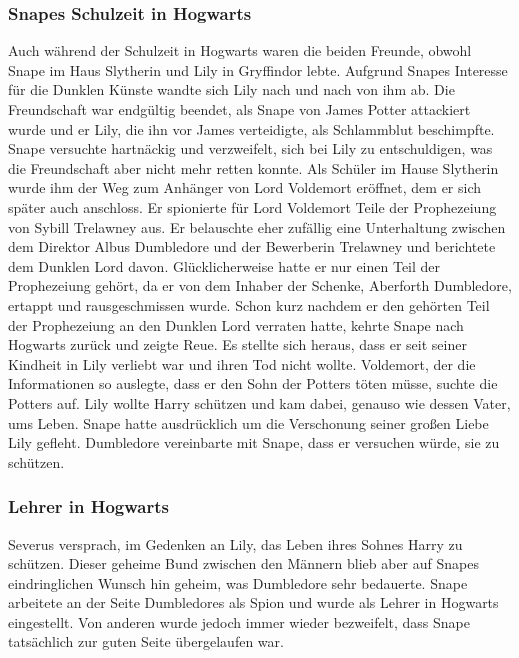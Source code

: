 \documentclass[a4paper, 10pt]{article}
\begin{document}
\subsubsection*{\large Snapes Schulzeit in Hogwarts}
Auch während der Schulzeit in Hogwarts waren die beiden Freunde, obwohl Snape im Haus Slytherin und Lily in Gryffindor lebte. Aufgrund Snapes Interesse für die Dunklen Künste wandte sich Lily nach und nach von ihm ab. Die Freundschaft war endgültig beendet, als Snape von James Potter attackiert wurde und er Lily, die ihn vor James verteidigte, als Schlammblut beschimpfte. Snape versuchte hartnäckig und verzweifelt, sich bei Lily zu entschuldigen, was die Freundschaft aber nicht mehr retten konnte.
\vspace{10pt}
\newline
{}  
Als Schüler im Hause Slytherin wurde ihm der Weg zum Anhänger von Lord Voldemort eröffnet, dem er sich später auch anschloss. Er spionierte für Lord Voldemort Teile der Prophezeiung von Sybill Trelawney aus. Er belauschte eher zufällig eine Unterhaltung zwischen dem Direktor Albus Dumbledore und der Bewerberin Trelawney und berichtete dem Dunklen Lord davon. Glücklicherweise hatte er nur einen Teil der Prophezeiung gehört, da er von dem Inhaber der Schenke, Aberforth Dumbledore, ertappt und rausgeschmissen wurde. Schon kurz nachdem er den gehörten Teil der Prophezeiung an den Dunklen Lord verraten hatte, kehrte Snape nach Hogwarts zurück und zeigte Reue. Es stellte sich heraus, dass er seit seiner Kindheit in Lily verliebt war und ihren Tod nicht wollte. Voldemort, der die Informationen so auslegte, dass er den Sohn der Potters töten müsse, suchte die Potters auf. Lily wollte Harry schützen und kam dabei, genauso wie dessen Vater, ums Leben. Snape hatte ausdrücklich um die Verschonung seiner großen Liebe Lily gefleht. Dumbledore vereinbarte mit Snape, dass er versuchen würde, sie zu schützen.

\subsubsection*{\large Lehrer in Hogwarts}
Severus versprach, im Gedenken an Lily, das Leben ihres Sohnes Harry zu schützen. Dieser geheime Bund zwischen den Männern blieb aber auf Snapes eindringlichen Wunsch hin geheim, was Dumbledore sehr bedauerte. Snape arbeitete an der Seite Dumbledores als Spion und wurde als Lehrer in Hogwarts eingestellt. Von anderen wurde jedoch immer wieder bezweifelt, dass Snape tatsächlich zur guten Seite übergelaufen war.
\end{document}
